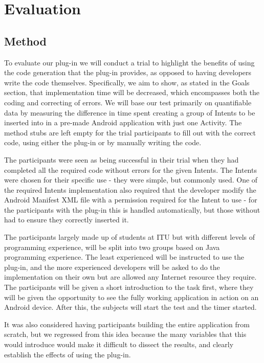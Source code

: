 \section{Evaluation}
\label{evaluation}

\subsection{Method}
\label{Method}
To evaluate our plug-in we will conduct a trial to highlight the benefits of using the code generation that the plug-in provides, as opposed to having developers write the code themselves. Specifically, we aim to show, as stated in the Goals section, that implementation time will be decreased, which encompasses both the coding and correcting of errors. We will base our test primarily on quantifiable data by measuring the difference in time spent creating a group of Intents to be inserted into in a pre-made Android application with just one Activity. The method stubs are left empty for the trial participants to fill out with the correct code, using either the plug-in or by manually writing the code.

The participants were seen as being successful in their trial when they had completed all the required code without errors for the given Intents. The Intents were chosen for their specific use - they were simple, but commonly used. One of the required Intents implementation also required that the developer modify the Android Manifest XML file with a permission required for the Intent to use - for the participants with the plug-in this is handled automatically, but those without had to ensure they correctly inserted it.

The participants largely made up of students at ITU but with different levels of programming experience, will be split into two groups based on Java programming experience. The least experienced will be instructed to use the plug-in, and the more experienced developers will be asked to do the implementation on their own but are allowed any Internet resource they require. The participants will be given a short introduction to the task first, where they will be given the opportunity to see the fully working application in action on an Android device. After this, the subjects will start the test and the timer started.

It was also considered having participants building the entire application from scratch, but we regressed from this idea because the many variables that this would introduce would make it difficult to dissect the results, and clearly establish the effects of using the plug-in.

